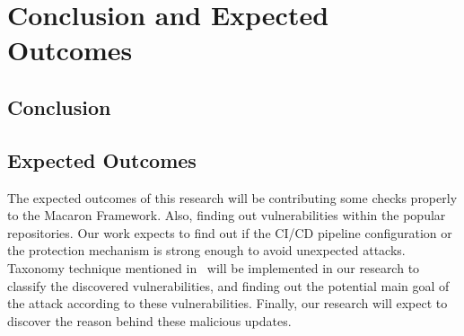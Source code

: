 \section{Conclusion and Expected Outcomes}
\subsection{Conclusion}

\subsection{Expected Outcomes}
The expected outcomes of this research will be contributing some checks properly to the Macaron 
Framework. Also, finding out vulnerabilities within the popular repositories. Our work expects to 
find out if the CI/CD pipeline configuration or the protection mechanism is strong enough to 
avoid unexpected attacks. Taxonomy technique mentioned in~\cite{ohm2020backstabber} will be 
implemented in our research to classify the discovered vulnerabilities, and finding out the potential
main goal of the attack according to these vulnerabilities. Finally, our research will expect to 
discover the reason behind these malicious updates.   
